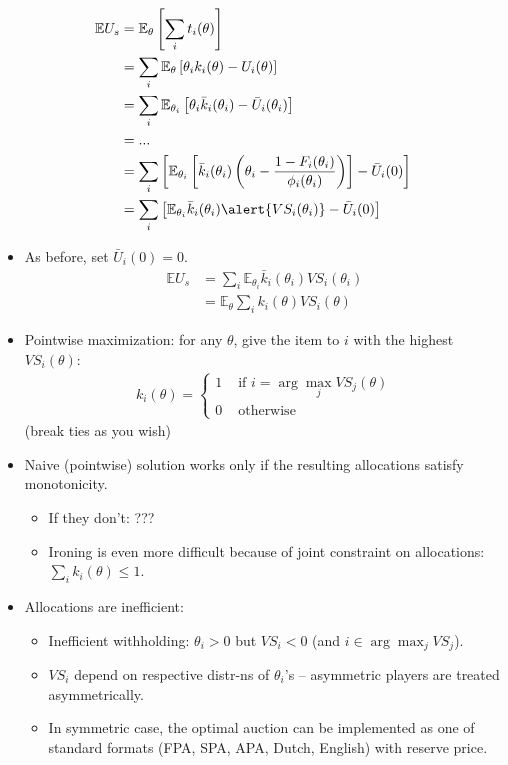 \documentclass[english,handout,10pt]{beamer}		%
\def\lyxframeend{} %
\begin{document}
\begin{align*}
\mathbb{E} U_s &= \mathbb{E}_\theta \left[ \sum_i t_i(\theta) \right]
\\ &= \sum_i \mathbb{E}_{\theta} \left[ \theta_i k_i(\theta) - U_i(\theta) \right]
\\ &= \sum_i \mathbb{E}_{\theta_i} \left[ \theta_i \bar{k}_i(\theta_i) - \bar{U}_i(\theta_i) \right]
\\  &= ...
\\ &= \sum_i \left[ \mathbb{E}_{\theta_i} \left[ \bar{k}_i(\theta_i) \left( \theta_i - \frac{1-F_i(\theta_i)}{\phi_i(\theta_i)} \right) \right] - \bar{U}_i(0)\right]
\\ &= \sum_i \left[ \mathbb{E}_{\theta_i} \bar{k}_i(\theta_i) \alert{VS_i(\theta_i)} - \bar{U}_i(0) \right]
\end{align*}
\lyxframeend


\begin{itemize}
	\item As before, set $\bar{U}_i(0) = 0$.
	{\footnotesize
	\begin{align*}
		\mathbb{E} U_s &= \sum_i \mathbb{E}_{\theta_i} \bar{k}_i(\theta_i) VS_i(\theta_i)
		\\
		&= \mathbb{E}_{\theta} \sum_i k_i(\theta) VS_i(\theta)
	\end{align*}
	}
	\item Pointwise maximization: for any $\theta$, give the item to $i$ with the highest $VS_i(\theta)$:
	\begin{align*}
		k_i(\theta) = 
		\begin{cases}
			1 & \text{ if } i = \arg \max_j VS_j(\theta)
			\\
			0 & \text { otherwise}
		\end{cases}
	\end{align*}
	(break ties as you wish)
\end{itemize}
\lyxframeend


\begin{itemize}
	\item Naive (pointwise) solution works only if the resulting allocations satisfy monotonicity.
	\begin{itemize}
		\item If they don't: ???
		\item Ironing is even more difficult because of joint constraint on allocations: $\sum_i k_i (\theta) \leq 1$.
	\end{itemize}
	\item Allocations are inefficient:
	\begin{itemize}
		\item Inefficient withholding: $\theta_i > 0$ but $VS_i < 0$ (and $i \in \arg \max_j VS_j$).
		\item $VS_i$ depend on respective distr-ns of $\theta_i$'s -- asymmetric players are treated asymmetrically.
		\item In symmetric case, the optimal auction can be implemented as one of standard formats (FPA, SPA, APA, Dutch, English) with reserve price.
	\end{itemize}
\end{itemize}
\lyxframeend
\end{document}
